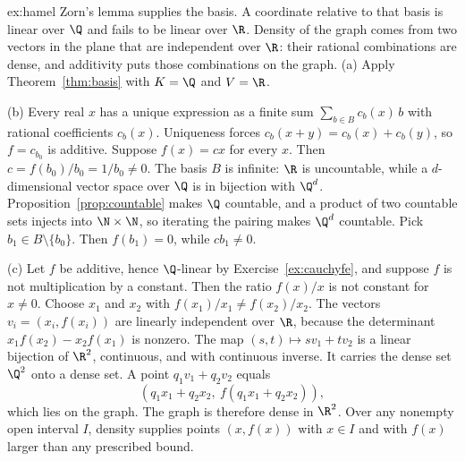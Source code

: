 \begin{solution}{ex:hamel}
\idea Zorn's lemma supplies the basis. A coordinate relative to that basis is linear over $\Q$ and fails to be linear over $\R$. Density of the graph comes from two vectors in the plane that are independent over $\R$: their rational combinations are dense, and additivity puts those combinations on the graph.
\writeup (a) Apply Theorem~\ref{thm:basis} with $K=\Q$ and $V=\R$.

(b) Every real $x$ has a unique expression as a finite sum $\sum_{b\in B}c_b(x)\,b$ with rational coefficients $c_b(x)$. Uniqueness forces $c_b(x+y)=c_b(x)+c_b(y)$, so $f=c_{b_0}$ is additive. Suppose $f(x)=cx$ for every $x$. Then $c=f(b_0)/b_0=1/b_0\ne 0$. The basis $B$ is infinite: $\R$ is uncountable, while a $d$-dimensional vector space over $\Q$ is in bijection with $\Q^d$. Proposition~\ref{prop:countable} makes $\Q$ countable, and a product of two countable sets injects into $\N\times\N$, so iterating the pairing makes $\Q^d$ countable. Pick $b_1\in B\setminus\{b_0\}$. Then $f(b_1)=0$, while $cb_1\ne 0$.

(c) Let $f$ be additive, hence $\Q$-linear by Exercise~\ref{ex:cauchyfe}, and suppose $f$ is not multiplication by a constant. Then the ratio $f(x)/x$ is not constant for $x\ne 0$. Choose $x_1$ and $x_2$ with $f(x_1)/x_1\ne f(x_2)/x_2$. The vectors $v_i=(x_i,f(x_i))$ are linearly independent over $\R$, because the determinant $x_1 f(x_2)-x_2 f(x_1)$ is nonzero. The map $(s,t)\mapsto s v_1+t v_2$ is a linear bijection of $\R^2$, continuous, and with continuous inverse. It carries the dense set $\Q^2$ onto a dense set. A point $q_1 v_1+q_2 v_2$ equals
\[
(q_1 x_1+q_2 x_2,\ f(q_1 x_1+q_2 x_2)),
\]
which lies on the graph. The graph is therefore dense in $\R^2$. Over any nonempty open interval $I$, density supplies points $(x,f(x))$ with $x\in I$ and with $f(x)$ larger than any prescribed bound.
\end{solution}

